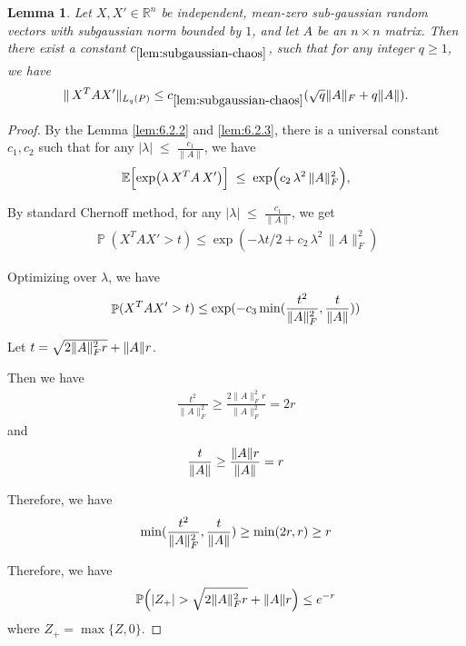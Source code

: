 \documentclass[11pt]{amsart}
\numberwithin{equation}{section}
\numberwithin{equation}{section}
\DeclareMathOperator{\Pb}{\mathbb{P}}
\DeclarePairedDelimiter{\norm}{\lVert}{\rVert}
\newtheorem{lemma}[theorem]{Lemma}
\begin{document}
\begin{lemma}\label{lem:subgaussian-chaos}
Let $X, X' \in \mathbb{R}^n$ be independent, mean-zero sub-gaussian random vectors with subgaussian norm bounded by $1$, 
and let $A$ be an $n\times n$ matrix. 
Then there exist a constant $c_{\ref{lem:subgaussian-chaos}}$, such that for any integer $q \ge 1$, we have
\begin{align*}
\|\,X^T A X'\|_{L_q(P)} 
\le c_{\ref{lem:subgaussian-chaos}}(\sqrt{q}\|A\|_F +q\|A\|).
\end{align*}
\end{lemma}


\begin{proof}


By the Lemma \ref{lem:6.2.2} and \ref{lem:6.2.3}, there is a universal constant $c_1,c_2$ such that for any $|\lambda| \;\le\; \frac{c_1}{\|A\|}$, we have
\begin{align*}
\mathbb{E}\Bigl[\exp\bigl(\lambda\,X^T A\,X'\bigr)\Bigr]
\;\le\;
\exp\Bigl(c_2\,\lambda^2\,\|A\|_F^2\Bigr),
\end{align*}

By standard Chernoff method, for any $|\lambda| \;\le\; \frac{c_1}{\|A\|}$, we get
\begin{align*}
    \Pb(X^T AX'>t) \le \exp(-\lambda t/2+c_2\,\lambda^2\,\|A\|_F^2)
\end{align*}

Optimizing over $\lambda$, we have
\begin{align*}
    \Pb(X^T AX'>t) \le \exp(-c_3\min(\frac{t^2}{\|A\|_F^2},\frac{t}{\norm{A}}))
\end{align*}

Let $t=\sqrt{2 \|A\|_F^2 r} + \norm{A}r$.

Then we have
\begin{align*}
    \frac{t^2}{\|A\|_F^2} \ge \frac{2 \|A\|_F^2 r}{\|A\|_F^2}=2r
\end{align*}
and
\begin{align*}
    \frac{t}{\norm{A}} \ge \frac{\norm{A}r}{\|A\|}=r
\end{align*}

Therefore, we have
\begin{align*}
    \min(\frac{t^2}{\|A\|_F^2},\frac{t}{\norm{A}}) \ge \min(2r,r) \ge r
\end{align*}

Therefore, we have
\begin{align*}
\mathbb{P}\Bigl(|Z_+|>\sqrt{2 \|A\|_F^2 r} + \norm{A}r\Bigr)\le e^{-r}
\end{align*}
 where $Z_+=\max\{Z,0\}$.




\end{proof}
\end{document}
